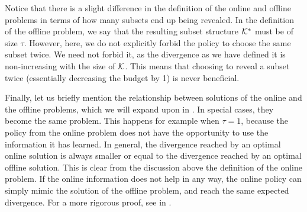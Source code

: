 Notice that there is a slight difference in the definition of the online and offline problems in terms of how many subsets end up being revealed.
In the definition of the offline problem, we say that the resulting subset structure $ \mathcal{K}^* $ must be of size $ \tau $.
However, here, we do not explicitly forbid the policy to choose the same subset twice.
We need not forbid it, as the divergence as we have defined it is non-increasing with the size of $ \mathcal{K} $.
This means that choosing to reveal a subset twice (essentially decreasing the budget by 1) is never beneficial.

Finally, let us briefly mention the relationship between solutions of the online and the offline problems, which we will expand upon in .
In special cases, they become the same problem.
This happens for example when $ \tau = 1 $, because the policy from the online problem does not have the opportunity to use the information it has learned.
In general, the divergence reached by an optimal online solution is always smaller or equal to the divergence reached by an optimal offline solution.
This is clear from the discussion above the definition of the online problem.
If the online information does not help in any way, the online policy can simply mimic the solution of the offline problem, and reach the same expected divergence.
For a more rigorous proof, see  in .
